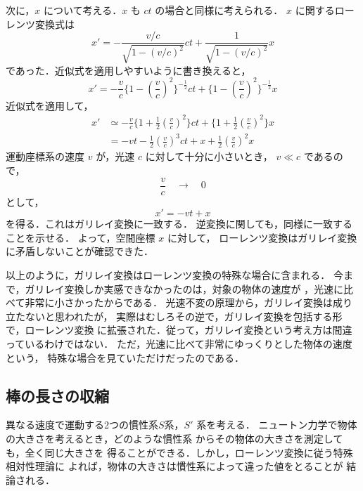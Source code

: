 次に，$x$ について考える．$x$ も $ct$ の場合と同様に考えられる．
$x$ に関するローレンツ変換式は
    \begin{equation*}
    x'=-\frac{v/c}{\sqrt{ 1-(v/c)^{2} }}ct+\frac{1}{\sqrt{ 1-(v/c)^{2} }} x
    \end{equation*}
であった．近似式を適用しやすいように書き換えると，
    \begin{equation*}
    x'=-\frac{v}{c}\biggl\{1-\left(\frac{v}{c}\right)^{2}\biggr\}^{-\frac{1}{2}}ct
    +\biggl\{1-\left(\frac{v}{c}\right)^{2}\biggr\}^{-\frac{1}{2}}x
    \end{equation*}
近似式を適用して，
    \begin{align*}
    x'&\simeq -\frac{v}{c}\biggl\{1+\frac{1}{2}\left(\frac{v}{c}\right)^{2}\biggr\}ct
    +\biggl\{1+\frac{1}{2}\left(\frac{v}{c}\right)^{2}\biggr\}x \\
    &=-vt-\frac{1}{2}\left(\frac{v}{c}\right)^{3}ct+x+\frac{1}{2}\left(\frac{v}{c}\right)^{2}x
    \end{align*}
運動座標系の速度 $v$ が，光速 $c$ に対して十分に小さいとき，
$v\ll c$ であるので，
    \begin{equation*}
    \frac{v}{c}\quad \longrightarrow \quad 0
    \end{equation*}
として，
    \begin{equation*}
    x'=-vt+x
    \end{equation*}
を得る．これはガリレイ変換に一致する．
逆変換に関しても，同様に一致することを示せる．
よって，空間座標 $x$ に対して，
ローレンツ変換はガリレイ変換に矛盾しないことが確認できた．



以上のように，ガリレイ変換はローレンツ変換の特殊な場合に含まれる．
今まで，ガリレイ変換しか実感できなかったのは，対象の物体の速度が
，光速に比べて非常に小さかったからである．
光速不変の原理から，ガリレイ変換は成り立たないと思われたが，
実際はむしろその逆で，ガリレイ変換を包括する形で，ローレンツ変換
に拡張された．従って，ガリレイ変換という考え方は間違っているわけではない．
ただ，光速に比べて非常にゆっくりとした物体の速度という，
特殊な場合を見ていただけだったのである．




\subsection{棒の長さの収縮}

    異なる速度で運動する2つの慣性系$S$系，$S'$ 系を考える．
    ニュートン力学で物体の大きさを考えるとき，どのような慣性系
    からその物体の大きさを測定しても，全く同じ大きさを
    得ることができる．しかし，ローレンツ変換に従う特殊相対性理論に
    よれば，物体の大きさは慣性系によって違った値をとることが
    結論される．

